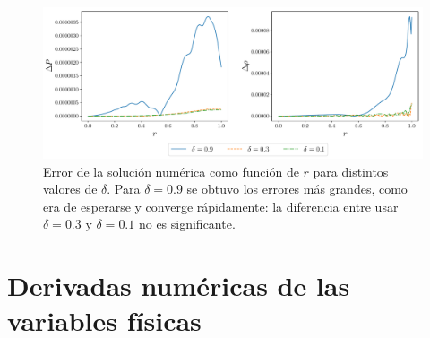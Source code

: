 \begin{figure}%
    \centering
    \includegraphics[width=\linewidth]{figures/ErrorTolmanVIImu45.pdf}
    \caption[Error de la solución numérica respecto a la exacta]{Error de la solución numérica como función de $r$ para distintos valores de $\delta$. Para $\delta=0.9$ se obtuvo los errores más grandes, como era de esperarse y converge rápidamente: la diferencia entre usar $\delta=0.3$ y $\delta=0.1$ no es significante.}
    \label{ErrorExact}
\end{figure}


\section{Derivadas numéricas de las variables físicas}\label{NumDer}  

